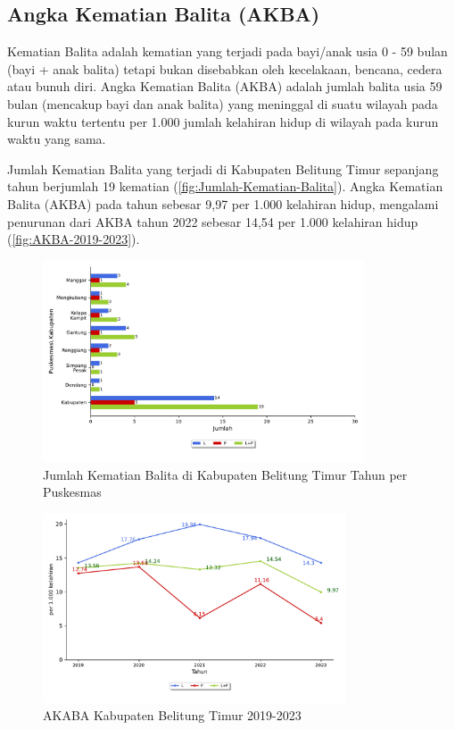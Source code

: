 \subsection{Angka Kematian Balita (AKBA)}
Kematian Balita adalah kematian yang terjadi pada bayi/anak usia 0 - 59 bulan (bayi + anak balita) tetapi bukan disebabkan oleh kecelakaan, bencana, cedera atau bunuh diri. Angka Kematian Balita (AKBA) adalah jumlah balita usia 59 bulan (mencakup bayi dan anak balita) yang meninggal di suatu wilayah pada kurun waktu tertentu
per 1.000 jumlah kelahiran hidup di wilayah pada kurun waktu yang sama.

Jumlah Kematian Balita yang terjadi di Kabupaten Belitung Timur sepanjang tahun \tP berjumlah 19 kematian (\autoref{fig:Jumlah-Kematian-Balita}). Angka Kematian Balita (AKBA) pada tahun \tP sebesar 9,97 per 1.000 kelahiran hidup, mengalami penurunan dari AKBA tahun 2022 sebesar 14,54 per 1.000 kelahiran hidup (\autoref{fig:AKBA-2019-2023}).

\begin{figure}[H]
    \centering{}
    \includegraphics[width=0.85\textwidth]{bab_05/bab_05_11_kematianBalita}
    \caption{Jumlah Kematian Balita di Kabupaten Belitung Timur Tahun \tP per Puskesmas}
    \label{fig:Jumlah-Kematian-Balita}
\end{figure}

\begin{figure}[H]
    \centering{}
    \includegraphics[width=0.8\textwidth]{bab_05/bab_05_11_plotBalita}
    \caption{AKABA Kabupaten Belitung Timur 2019-2023}
    \label{fig:AKBA-2019-2023}
\end{figure}

